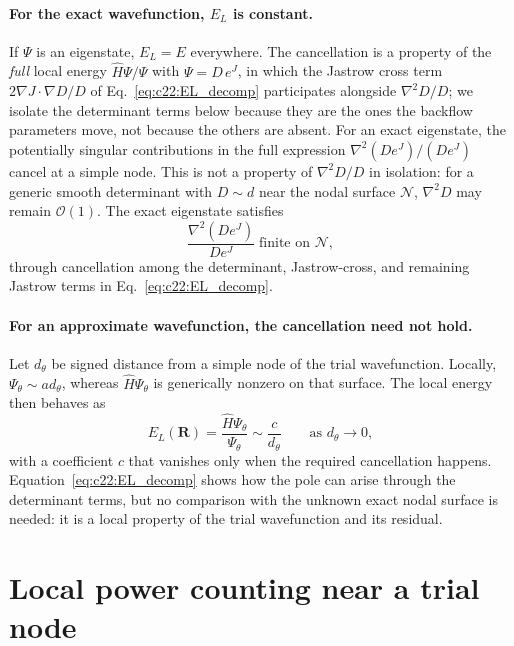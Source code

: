 \paragraph{For the exact wavefunction, $E_L$ is constant.}
If $\Psi$ is an eigenstate, $E_L=E$ everywhere. The cancellation is a property of the
\emph{full} local energy $\hat H\Psi/\Psi$ with $\Psi=D\,e^{J}$, in which the Jastrow cross
term $2\nabla J\cdot\nabla D/D$ of Eq.~\eqref{eq:c22:EL_decomp} participates alongside
$\nabla^2D/D$; we isolate the determinant terms below because they are the ones the backflow
parameters move, not because the others are absent.
For an exact eigenstate, the potentially singular contributions in the full
expression $\nabla^2(De^J)/(De^J)$ cancel at a simple node. This is not a
property of $\nabla^2D/D$ in isolation: for a generic smooth determinant with
$D\sim d$ near the nodal surface $\mathcal N$, $\nabla^2D$ may remain
$\mathcal O(1)$. The exact eigenstate satisfies
\begin{equation}
\frac{\nabla^2(De^J)}{De^J}\;\text{finite on }\mathcal N,
\label{eq:c22:exact_cancel}
\end{equation}
through cancellation among the determinant, Jastrow-cross, and remaining
Jastrow terms in Eq.~\eqref{eq:c22:EL_decomp}.

\paragraph{For an approximate wavefunction, the cancellation need not hold.}
Let $d_\theta$ be signed distance from a simple node of the trial wavefunction.
Locally, $\Psi_\theta\sim a d_\theta$, whereas $\hat H\Psi_\theta$ is generically
nonzero on that surface. The local energy then behaves as
\begin{equation}
E_L(\mathbf R)
=\frac{\hat H\Psi_\theta}{\Psi_\theta}
\sim \frac{c}{d_\theta}
\qquad\text{as }d_\theta\to 0,
\label{eq:c22:EL_div}
\end{equation}
with a coefficient $c$ that vanishes only when the required cancellation happens.
Equation~\eqref{eq:c22:EL_decomp} shows how the pole can arise through the determinant
terms, but no comparison with the unknown exact nodal surface is needed: it is a local
property of the trial wavefunction and its residual.


\section{Local power counting near a trial node}
\label{app:catch22:mismatch}

